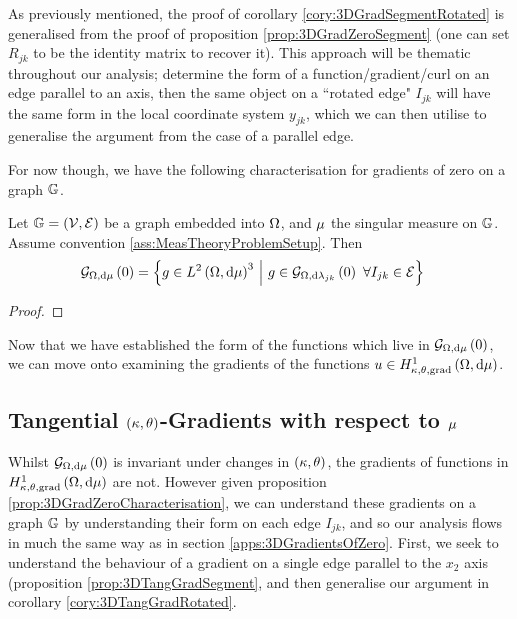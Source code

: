 As previously mentioned, the proof of corollary \ref{cory:3DGradSegmentRotated} is generalised from the proof of proposition \ref{prop:3DGradZeroSegment} (one can set $R_{jk}$ to be the identity matrix to recover it).
This approach will be thematic throughout our analysis; determine the form of a function/gradient/curl on an edge parallel to an axis, then the same object on a ``rotated edge" $I_{jk}$ will have the same form in the local coordinate system $y_{jk}$, which we can then utilise to generalise the argument from the case of a parallel edge.

For now though, we have the following characterisation for gradients of zero on a graph $\mathbb{G}$.
\begin{prop} \label{prop:3DGradZeroCharacterisation}
	Let $\mathbb{G}=\left( \mathcal{V}, \mathcal{E} \right)$ be a graph embedded into $\Omega$, and $\mu$ the singular measure on $\mathbb{G}$.
	Assume convention \ref{ass:MeasTheoryProblemSetup}.
	Then
	\begin{align*}
		\gradZero{\ddom}{\ddmes} &= \clbracs{ g\in\ltwo{\ddom}{\ddmes}^3 \setVert g\in\gradZero{\ddom}{\lambda_{jk}} \ \forall I_{jk}\in\edgeSet }
	\end{align*}
\end{prop}
\begin{proof}
\end{proof}
Now that we have established the form of the functions which live in $\mathcal{G}_{ \Omega, \mathrm{d}\mu}\left( 0 \right)$, we can move onto examining the gradients of the functions $u\in H^1_{\kappa,\theta,\mathrm{grad}}\left( \Omega, \mathrm{d}\mu \right)$.

\subsection{Tangential $\left( \kappa, \theta \right)$-Gradients with respect to $\mu$} \label{apps:3DTangentialGradients}
Whilst $\mathcal{G}_{ \Omega, \mathrm{d}\mu}\left( 0 \right)$ is invariant under changes in $\left( \kappa, \theta \right)$, the gradients of functions in $H^1_{\kappa,\theta,\mathrm{grad}}\left( \Omega, \mathrm{d}\mu \right)$ are not.
However given proposition \ref{prop:3DGradZeroCharacterisation}, we can understand these gradients on a graph $\mathbb{G}$ by understanding their form on each edge $I_{jk}$, and so our analysis flows in much the same way as in section \ref{apps:3DGradientsOfZero}.
First, we seek to understand the behaviour of a gradient on a single edge parallel to the $x_2$ axis (proposition \ref{prop:3DTangGradSegment}, and then generalise our argument in corollary \ref{cory:3DTangGradRotated}.

